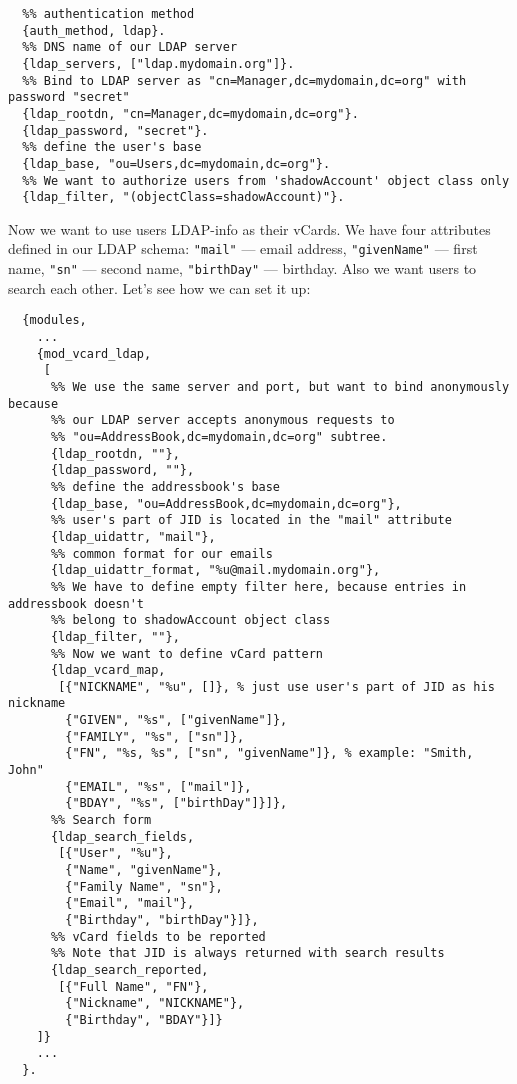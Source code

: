 \documentclass[a4paper,10pt]{article}
\newcommand{\term}[1]{\texttt{#1}}
\begin{document}
\begin{verbatim}
  %% authentication method
  {auth_method, ldap}.
  %% DNS name of our LDAP server
  {ldap_servers, ["ldap.mydomain.org"]}.
  %% Bind to LDAP server as "cn=Manager,dc=mydomain,dc=org" with password "secret"
  {ldap_rootdn, "cn=Manager,dc=mydomain,dc=org"}.
  {ldap_password, "secret"}.
  %% define the user's base
  {ldap_base, "ou=Users,dc=mydomain,dc=org"}.
  %% We want to authorize users from 'shadowAccount' object class only
  {ldap_filter, "(objectClass=shadowAccount)"}.
\end{verbatim}

Now we want to use users LDAP-info as their vCards.  We have four attributes
defined in our LDAP schema: \term{"mail"} --- email address, \term{"givenName"}
--- first name, \term{"sn"} --- second name, \term{"birthDay"} --- birthday.
Also we want users to search each other.  Let's see how we can set it up:

\begin{verbatim}
  {modules,
    ...
    {mod_vcard_ldap,
     [
      %% We use the same server and port, but want to bind anonymously because
      %% our LDAP server accepts anonymous requests to
      %% "ou=AddressBook,dc=mydomain,dc=org" subtree.
      {ldap_rootdn, ""},
      {ldap_password, ""},
      %% define the addressbook's base
      {ldap_base, "ou=AddressBook,dc=mydomain,dc=org"},
      %% user's part of JID is located in the "mail" attribute
      {ldap_uidattr, "mail"},
      %% common format for our emails
      {ldap_uidattr_format, "%u@mail.mydomain.org"},
      %% We have to define empty filter here, because entries in addressbook doesn't
      %% belong to shadowAccount object class
      {ldap_filter, ""},
      %% Now we want to define vCard pattern
      {ldap_vcard_map,
       [{"NICKNAME", "%u", []}, % just use user's part of JID as his nickname
        {"GIVEN", "%s", ["givenName"]},
        {"FAMILY", "%s", ["sn"]},
        {"FN", "%s, %s", ["sn", "givenName"]}, % example: "Smith, John"
        {"EMAIL", "%s", ["mail"]},
        {"BDAY", "%s", ["birthDay"]}]},
      %% Search form
      {ldap_search_fields,
       [{"User", "%u"},
        {"Name", "givenName"},
        {"Family Name", "sn"},
        {"Email", "mail"},
        {"Birthday", "birthDay"}]},
      %% vCard fields to be reported
      %% Note that JID is always returned with search results
      {ldap_search_reported,
       [{"Full Name", "FN"},
        {"Nickname", "NICKNAME"},
        {"Birthday", "BDAY"}]}
    ]}
    ...
  }.
\end{verbatim}
\end{document}
